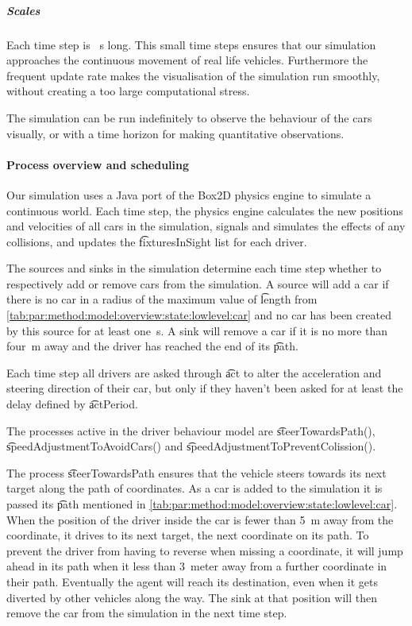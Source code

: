 \subparagraph{Scales}
Each time step is \si{s} long. This small time steps ensures that our simulation approaches the continuous movement of real life vehicles. Furthermore the frequent update rate makes the visualisation of the simulation run smoothly, without creating a too large computational stress.

The simulation can be run indefinitely to observe the behaviour of the cars visually, or with a time horizon for making quantitative observations.

\paragraph{Process overview and scheduling}
\label{par:method:model:overview:process}
Our simulation uses a Java port of the Box2D physics engine to simulate a continuous world. Each time step, the physics engine calculates the new positions and velocities of all cars in the simulation, signals and simulates the effects of any collisions, and updates the \t{fixturesInSight} list for each driver.

The sources and sinks in the simulation determine each time step whether to respectively add or remove cars from the simulation. A source will add a car if there is no car in a radius of the maximum value of \t{length} from \cref{tab:par:method:model:overview:state:lowlevel:car} and no car has been created by this source for at least \si{one \second}. A sink will remove a car if it is no more than \si{four \meter} away and the driver has reached the end of its \t{path}.

Each time step all drivers are asked through \t{act} to alter the acceleration and steering direction of their car, but only if they haven't been asked for at least the delay defined by \t{actPeriod}.

The processes active in the driver behaviour model are \t{steerTowardsPath()}, \t{speedAdjustmentToAvoidCars()} and \t{speedAdjustmentToPreventColission()}.

The process \t{steerTowardsPath} ensures that the vehicle steers towards its next target along the path of coordinates. As a car is added to the simulation it is passed its \t{path} mentioned in \cref{tab:par:method:model:overview:state:lowlevel:car}. When the position of the driver inside the car is fewer than \si{5\meter} away from the coordinate, it drives to its next target, the next coordinate on its path. To prevent the driver from having to reverse when missing a coordinate, it will jump ahead in its path when it less than \si{3 meter} away from a further coordinate in their path. Eventually the agent will reach its destination, even when it gets diverted by other vehicles along the way. The sink at that position will then remove the car from the simulation in the next time step.

